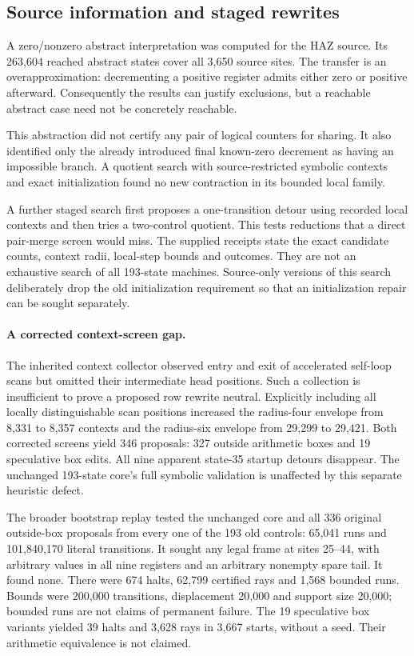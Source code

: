 \documentclass[11pt,letterpaper]{article}
\begin{document}
\subsection{Source information and staged rewrites}

A zero/nonzero abstract interpretation was computed for the HAZ source.
Its 263,604 reached abstract states cover all 3,650 source sites. The transfer
is an overapproximation: decrementing a positive register admits either zero
or positive afterward. Consequently the results can justify exclusions,
but a reachable abstract case need not be concretely reachable.

This abstraction did not certify any pair of logical counters for sharing. It also identified only the already introduced final
known-zero decrement as having an impossible branch. A quotient search with
source-restricted symbolic contexts and exact initialization found no new
contraction in its bounded local family.

A further staged search first proposes a one-transition detour using
recorded local contexts and then tries a two-control quotient. This tests reductions that a
direct pair-merge screen would miss. The supplied receipts state the exact
candidate counts, context radii, local-step bounds and outcomes. They are
not an exhaustive search of all 193-state machines. Source-only versions of
this search deliberately drop the old initialization requirement so that
an initialization repair can be sought separately.

\paragraph{A corrected context-screen gap.}
The inherited context collector observed entry and exit of accelerated
self-loop scans but omitted their intermediate head positions. Such a
collection is insufficient to prove a proposed row rewrite neutral.
Explicitly including all locally distinguishable scan positions increased
the radius-four envelope from 8,331 to 8,357 contexts and the radius-six
envelope from 29,299 to 29,421. Both corrected screens yield 346 proposals:
327 outside arithmetic boxes and 19 speculative box edits. All nine
apparent state-35 startup detours disappear. The unchanged 193-state core's
full symbolic validation is unaffected by this separate heuristic defect.

The broader bootstrap replay tested the unchanged core and all 336 original
outside-box proposals from every one of the 193 old controls: 65,041 runs
and 101,840,170 literal transitions. It sought any legal frame at sites
25--44, with arbitrary values in all nine registers and an arbitrary
nonempty spare tail. It found none. There were 674 halts, 62,799 certified
rays and 1,568 bounded runs. Bounds were 200,000 transitions, displacement
20,000 and support size 20,000; bounded runs are not claims of permanent
failure. The 19 speculative box variants yielded 39 halts and 3,628 rays
in 3,667 starts, without a seed. Their arithmetic equivalence is not claimed.
\end{document}
